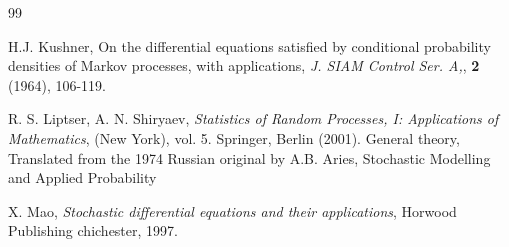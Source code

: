 \documentclass[12pt]{amsart}
\theoremstyle{remark}
\numberwithin{equation}{section}
\numberwithin{equation}{section}
\newcommand{\1}{\boldsymbol{1}}
\begin{document}
\begin{thebibliography}{99}
{%






  H.J.  Kushner, On the differential equations satisfied by conditional probability densities of Markov processes, with applications,
  {\it J. SIAM Control Ser. A,}, {\bf 2} (1964), 106-119.

 R. S. Liptser, A. N. Shiryaev, {\it Statistics of Random Processes, I: Applications of Mathematics}, (New
York), vol. 5. Springer, Berlin (2001). General theory, Translated from the 1974 Russian original by
A.B. Aries, Stochastic Modelling and Applied Probability



 X. Mao,  \emph{ Stochastic differential equations and their applications}, Horwood Publishing chichester, 1997.

}
\end{thebibliography}
\end{document}
